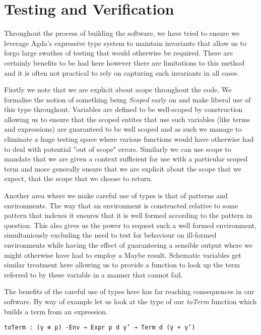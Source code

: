 \chapter{Testing and Verification}

Throughout the process of building the software, we have tried to
ensure we leverage Agda's expressive type system to maintain
invariants that allow us to forgo large swathes of testing that would
otherwise be required. There are certainly benefits to be had here
however there are limitations to this method and it is often not
practical to rely on capturing such invariants in all cases.

Firstly we note that we are explicit about scope throughout the
code. We formalise the notion of something being \emph{Scoped} early
on and make liberal use of this type throughout. Variables are defined
to be well-scoped by construction allowing 
us to ensure that the scoped entites that use such variables (like
terms and expressions) are guaranteed to be well scoped and as such we
manage to eliminate a huge testing space where various functions would
have otherwise had to deal with potential "out of scope"
errors. Similarly we can use scope to mandate that we are given a
context sufficient for use with a particular scoped term and more
generally ensure that we are explicit about the scope that we expect,
that the scope that we choose to return.

Another area where we make careful use of types is that of patterns
and environments. The way that an environment is
constructed relative to some pattern that indexes it ensures that it
is well formed according to the pattern in question. This also gives
us the power to request such a well formed environment, simultaniously
excluding the need to test for behaviour on ill-formed environments
while having the effect of guaranteeing a sensible output where we
might otherwise have had to employ a Maybe result. Schematic variables
get similar treatment here allowing us to provide a function to look
up the term referred to by these variable in a manner that cannot
fail. 

The benefits of the careful use of types here has far reaching
consequences in our software. By way of example let us look at the
type of our \emph{toTerm} function which builds a term from an expression.

\begin{verbatim}
toTerm : (γ ⊗ p) -Env → Expr p d γ’ → Term d (γ + γ’)
\end{verbatim}

